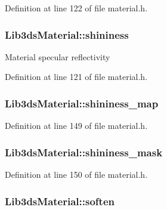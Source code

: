 Definition at line 122 of file material.\-h.

\hypertarget{struct_lib3ds_material_aea6993782a5182e1f4abfc7940e57213}{
\subsubsection[{shininess}]{ Lib3ds\-Material\-::shininess}}\label{struct_lib3ds_material_aea6993782a5182e1f4abfc7940e57213}
Material specular reflectivity 

Definition at line 121 of file material.\-h.

\hypertarget{struct_lib3ds_material_a8db83046874d085ba7c491d7ba0aaef8}{
\subsubsection[{shininess\-\_\-map}]{ Lib3ds\-Material\-::shininess\-\_\-map}}\label{struct_lib3ds_material_a8db83046874d085ba7c491d7ba0aaef8}


Definition at line 149 of file material.\-h.

\hypertarget{struct_lib3ds_material_ab13f224b864f2fbbec9f0099f20cae58}{
\subsubsection[{shininess\-\_\-mask}]{ Lib3ds\-Material\-::shininess\-\_\-mask}}\label{struct_lib3ds_material_ab13f224b864f2fbbec9f0099f20cae58}


Definition at line 150 of file material.\-h.

\hypertarget{struct_lib3ds_material_aeb7aedad192998587f46bec43306b440}{
\subsubsection[{soften}]{ Lib3ds\-Material\-::soften}}\label{struct_lib3ds_material_aeb7aedad192998587f46bec43306b440}


